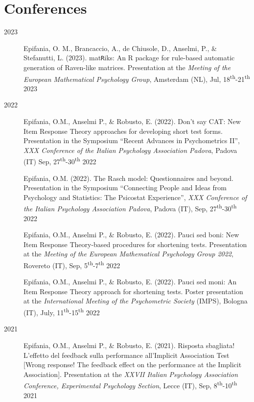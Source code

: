 \documentclass[letterpaper,12pt]{article}
\begin{document}
\section{Conferences}
\begin{description}
	\item[2023] 
	\item[] Epifania, O. M., Brancaccio, A., de Chiusole, D., Anselmi, P., \& Stefanutti, L. (2023). mat\texttt{R}iks: An R package for rule-based automatic generation of Raven-like matrices. Presentation at the \emph{Meeting of the European Mathematical Psychology Group},  Amsterdam (NL), Jul, 18\textsuperscript{th}-21\textsuperscript{th} 2023
	
	\item[2022]
	\item[] Epifania, O.M., Anselmi P., \& Robusto, E. (2022). Don't say CAT: New Item Response Theory approaches for developing short test forms. Presentation in the Symposium “Recent Advances in Psychometrics II”, \emph{XXX Conference of the Italian Psychology Association Padova}, Padova (IT) Sep, 27\textsuperscript{th}-30\textsuperscript{th} 2022
	
	\item[] Epifania, O.M. (2022). The Rasch model: Questionnaires and beyond. Presentation in the Symposium “Connecting People and Ideas from Psychology and Statistics: The Psicostat Experience”, \emph{XXX Conference of the Italian Psychology Association Padova}, Padova (IT), Sep, 27\textsuperscript{th}-30\textsuperscript{th} 2022
	
		\item[] Epifania, O.M., Anselmi P., \& Robusto, E. (2022). Pauci sed boni: New Item Response Theory-based procedures for shortening tests. Presentation at the \emph{Meeting of the European Mathematical Psychology Group 2022},  Rovereto (IT), Sep, 5\textsuperscript{th}-7\textsuperscript{th} 2022
	
	\item[] Epifania, O.M., Anselmi P., \& Robusto, E. (2022). Pauci sed moni: An Item Response Theory approach for shortening tests. Poster presentation at the \emph{International Meeting of the Psychometric Society} (IMPS), Bologna (IT), July, 11\textsuperscript{th}-15\textsuperscript{th} 2022
	
	\item[2021] 	
	\item[] Epifania, O.M., Anselmi P., \& Robusto, E. (2021). Risposta sbagliata! L’effetto del feedback sulla performance all’Implicit Association Test [Wrong response! The feedback effect on the performance at the Implicit Association]. Presentation at the \emph{XXVII Italian Psychology Association Conference, Experimental Psychology Section}, Lecce (IT), Sep, 8\textsuperscript{th}-10\textsuperscript{th} 2021
	

\end{description}
\end{document}
